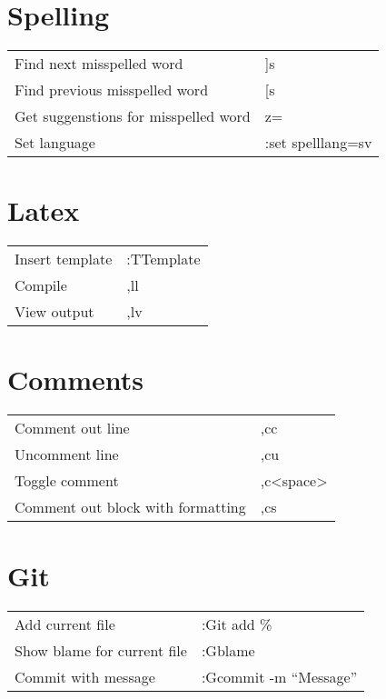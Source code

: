 \documentclass[a4paper]{report}
\def \tablewidth {10cm}
\begin{document}
\tableofcontents
\newpage

\section{Spelling}
\begin{tabularx}{\tablewidth}{| X | l |}
  \hline
  Find next misspelled word & ]s \\
  Find previous misspelled word & [s \\
  Get suggenstions for misspelled word & z= \\
  Set language & :set spelllang=sv \\
  \hline
\end{tabularx}

\section{Latex}
\begin{tabularx}{\tablewidth}{| X | l |}
  \hline
  Insert template & :TTemplate \\
  Compile & ,ll \\
  View output & ,lv\\
  \hline
\end{tabularx}

\section{Comments}
\begin{tabularx}{\tablewidth}{| X | l |}
  \hline
  Comment out line & ,cc \\
  Uncomment line & ,cu \\
  Toggle comment & ,c\textless space\textgreater \\
  Comment out block with formatting & ,cs \\
  \hline
\end{tabularx}

\section{Git}
\begin{tabularx}{\tablewidth}{| X | l |}
  \hline
  Add current file & :Git add \% \\
  Show blame for current file & :Gblame \\
  Commit with message & :Gcommit -m ``Message'' \\
  \hline
\end{tabularx}
\end{document}
